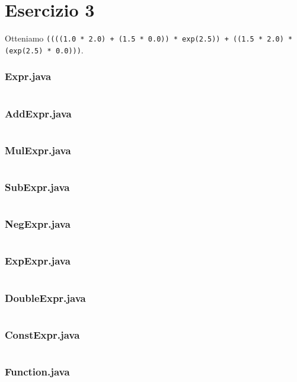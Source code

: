 \section*{Esercizio 3}

Otteniamo \texttt{((((1.0 * 2.0) + (1.5 * 0.0)) * exp(2.5)) + ((1.5 * 2.0) * (exp(2.5) * 0.0)))}.

\subsubsection*{Expr.java}
\inputminted{java}{tex/src/3/Expr.java}

\subsubsection*{AddExpr.java}
\inputminted{java}{tex/src/3/AddExpr.java}

\subsubsection*{MulExpr.java}
\inputminted{java}{tex/src/3/MulExpr.java}

\subsubsection*{SubExpr.java}
\inputminted{java}{tex/src/3/SubExpr.java}

\subsubsection*{NegExpr.java}
\inputminted{java}{tex/src/3/NegExpr.java}

\subsubsection*{ExpExpr.java}
\inputminted{java}{tex/src/3/ExpExpr.java}

\subsubsection*{DoubleExpr.java}
\inputminted{java}{tex/src/3/DoubleExpr.java}

\subsubsection*{ConstExpr.java}
\inputminted{java}{tex/src/3/ConstExpr.java}

\subsubsection*{Function.java}
\inputminted{java}{tex/src/3/Function.java}

